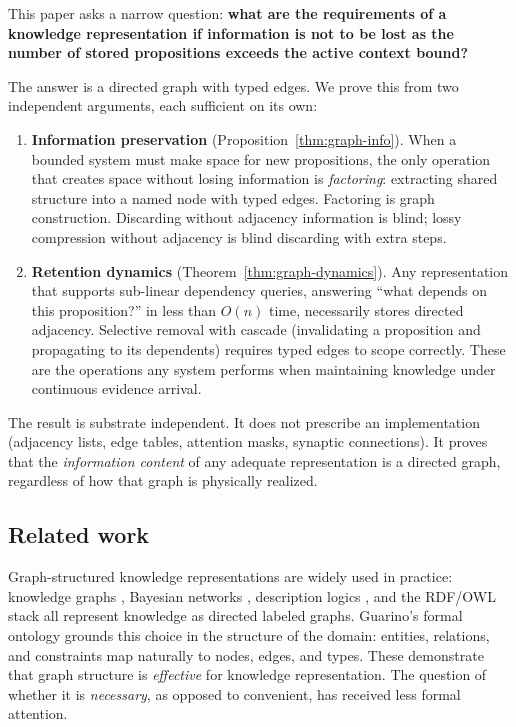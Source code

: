\documentclass[11pt]{article}
\theoremstyle{definition}
\begin{document}
This paper asks a narrow question: \textbf{what are the requirements of a knowledge representation if information
is not to be lost as the number of stored propositions exceeds the
active context bound?}

The answer is a directed graph with typed edges. We prove this from two
independent arguments, each sufficient on its own:

\begin{enumerate}
\item \textbf{Information preservation} (Proposition~\ref{thm:graph-info}).
   When a bounded system must make space for new propositions, the only
   operation that creates space without losing information is
   \emph{factoring}: extracting shared structure into a named node with
   typed edges. Factoring is graph construction. Discarding without
   adjacency information is blind; lossy compression without adjacency is
   blind discarding with extra steps.

\item \textbf{Retention dynamics} (Theorem~\ref{thm:graph-dynamics}).
   Any representation that supports sub-linear dependency queries,
   answering ``what depends on this proposition?'' in less than $O(n)$
   time, necessarily stores directed adjacency. Selective removal
   with cascade (invalidating a proposition and propagating to its
   dependents) requires typed edges to scope correctly. These are the
   operations any system performs when maintaining knowledge under
   continuous evidence arrival.
\end{enumerate}

The result is substrate independent. It does not prescribe an
implementation (adjacency lists, edge tables, attention masks, synaptic
connections). It proves that the \emph{information content} of any
adequate representation is a directed graph, regardless of how that
graph is physically realized.

\subsection{Related work}

Graph-structured knowledge representations are widely used in practice:
knowledge graphs \cite{Hogan2021}, Bayesian networks \cite{Pearl1988},
description logics \cite{BaaderCalvaneseEtAl2003}, and the
RDF/OWL stack \cite{BernersLee2001} all represent knowledge as directed
labeled graphs. Guarino's formal ontology \cite{Guarino1998} grounds
this choice in the structure of the domain: entities, relations, and
constraints map naturally to nodes, edges, and types. These demonstrate that graph structure is \emph{effective} for knowledge
representation. The question of whether it is \emph{necessary}, as
opposed to convenient, has received less formal attention.
\end{document}
